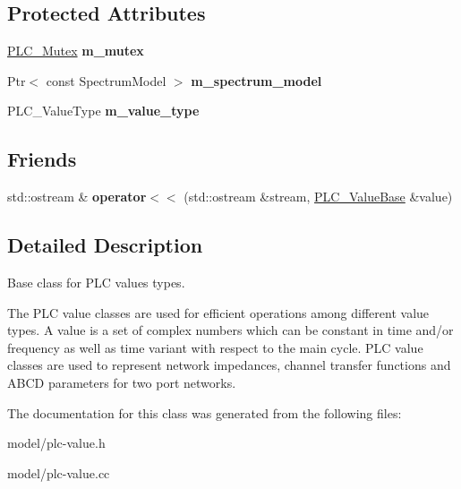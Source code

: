 \subsection*{\-Protected \-Attributes}
\begin{DoxyCompactItemize}
\item 
\hypertarget{classns3_1_1PLC__ValueBase_ada5e05a8498a3bf69e682404a15bfedb}{\hyperlink{structns3_1_1PLC__Mutex}{\-P\-L\-C\-\_\-\-Mutex} {\bfseries m\-\_\-mutex}}\label{classns3_1_1PLC__ValueBase_ada5e05a8498a3bf69e682404a15bfedb}

\item 
\hypertarget{classns3_1_1PLC__ValueBase_a3da12fe42a52936f4f72a1c635824ddd}{\-Ptr$<$ const \-Spectrum\-Model $>$ {\bfseries m\-\_\-spectrum\-\_\-model}}\label{classns3_1_1PLC__ValueBase_a3da12fe42a52936f4f72a1c635824ddd}

\item 
\hypertarget{classns3_1_1PLC__ValueBase_ae20150e2ae5678848c5961ebe4b6e9ab}{\-P\-L\-C\-\_\-\-Value\-Type {\bfseries m\-\_\-value\-\_\-type}}\label{classns3_1_1PLC__ValueBase_ae20150e2ae5678848c5961ebe4b6e9ab}

\end{DoxyCompactItemize}
\subsection*{\-Friends}
\begin{DoxyCompactItemize}
\item 
\hypertarget{classns3_1_1PLC__ValueBase_a2bf86fcf6c4f50fc8c925910881c7e37}{std\-::ostream \& {\bfseries operator$<$$<$} (std\-::ostream \&stream, \hyperlink{classns3_1_1PLC__ValueBase}{\-P\-L\-C\-\_\-\-Value\-Base} \&value)}\label{classns3_1_1PLC__ValueBase_a2bf86fcf6c4f50fc8c925910881c7e37}

\end{DoxyCompactItemize}


\subsection{\-Detailed \-Description}
\-Base class for \-P\-L\-C values types. 

\-The \-P\-L\-C value classes are used for efficient operations among different value types. \-A value is a set of complex numbers which can be constant in time and/or frequency as well as time variant with respect to the main cycle. \-P\-L\-C value classes are used to represent network impedances, channel transfer functions and \-A\-B\-C\-D parameters for two port networks. 

\-The documentation for this class was generated from the following files\-:\begin{DoxyCompactItemize}
\item 
model/plc-\/value.\-h\item 
model/plc-\/value.\-cc\end{DoxyCompactItemize}
